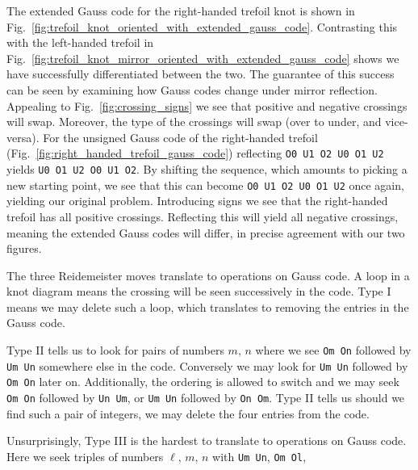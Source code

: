         The extended Gauss code for the right-handed trefoil knot is shown in
        Fig.~\ref{fig:trefoil_knot_oriented_with_extended_gauss_code}.
        Contrasting this with the left-handed trefoil in
        Fig.~\ref{fig:trefoil_knot_mirror_oriented_with_extended_gauss_code}
        shows we have successfully differentiated between the two. The
        guarantee of this success can be seen by examining how Gauss codes
        change under mirror reflection. Appealing to
        Fig.~\ref{fig:crossing_signs} we see that positive and negative
        crossings will swap. Moreover, the type of the crossings will swap
        (over to under, and vice-versa). For the unsigned Gauss code of the
        right-handed trefoil (Fig.~\ref{fig:right_handed_trefoil_gauss_code})
        reflecting \texttt{O0 U1 O2 U0 O1 U2} yields
        \texttt{U0 O1 U2 O0 U1 O2}. By shifting the sequence, which amounts
        to picking a new starting point, we see that this can become
        \texttt{O0 U1 O2 U0 O1 U2} once again, yielding our original problem.
        Introducing signs we see that the right-handed trefoil has all
        positive crossings. Reflecting this will yield all negative crossings,
        meaning the extended Gauss codes will differ, in precise agreement
        with our two figures.
        \par\hfill\par
        The three Reidemeister moves translate to operations on Gauss code.
        A loop in a knot diagram means the crossing will be seen successively
        in the code. Type I means we may delete such a loop, which translates
        to removing the entries in the Gauss code.
        \par\hfill\par
        Type II tells us to look for pairs of numbers $m,\,n$ where we see
        \texttt{Om On} followed by \texttt{Um Un} somewhere else in the code.
        Conversely we may look for \texttt{Um Un} followed by \texttt{Om On}
        later on. Additionally, the ordering is allowed to switch and we may
        seek \texttt{Om On} followed by \texttt{Un Um}, or
        \texttt{Um Un} followed by \texttt{On Om}. Type II tells us should we
        find such a pair of integers, we may delete the four entries from the
        code.
        \par\hfill\par
        Unsurprisingly, Type III is the hardest to translate to operations on
        Gauss code. Here we seek triples of numbers
        $\ell,\,m,\,n$ with \texttt{Um Un}, \texttt{Om Ol},
